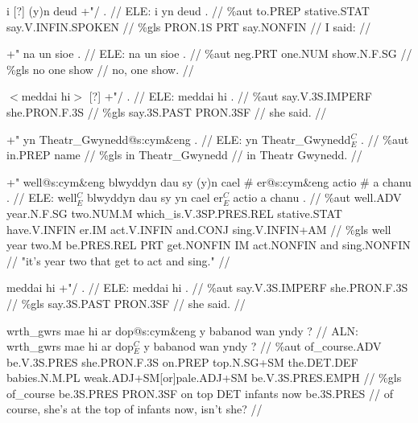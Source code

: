 \documentclass[a4paper,10pt]{article}
\begin{document}
\ex
\begingl[lingstyle=gergl]
\glchat i [?] (y)n deud +"/ . //
\glsurface ELE:  i yn deud .  //
\glauto \%aut  to{\scriptsize .PREP} stative{\scriptsize .STAT} say{\scriptsize .V.INFIN.SPOKEN}   //
\glmanual \%gls  PRON{\scriptsize .1S} PRT say{\scriptsize .NONFIN}   //
\gleng I said: //
\endgl
\xe

\ex
\begingl[lingstyle=gergl]
\glchat +" na un sioe . //
\glsurface ELE:  na un sioe .  //
\glauto \%aut  neg{\scriptsize .PRT} one{\scriptsize .NUM} show{\scriptsize .N.F.SG}   //
\glmanual \%gls  no one show   //
\gleng no, one show. //
\endgl
\xe

\ex
\begingl[lingstyle=gergl]
\glchat $<$meddai hi$>$ [?] +"/ . //
\glsurface ELE:  meddai hi .  //
\glauto \%aut  say{\scriptsize .V.3S.IMPERF} she{\scriptsize .PRON.F.3S}   //
\glmanual \%gls  say{\scriptsize .3S.PAST} PRON{\scriptsize .3SF}   //
\gleng she said. //
\endgl
\xe

\ex
\begingl[lingstyle=gergl]
\glchat +" yn Theatr\_Gwynedd@s:cym\&eng . //
\glsurface ELE:  yn Theatr\_Gwynedd$^{C}_{E}$ .  //
\glauto \%aut  in{\scriptsize .PREP} name   //
\glmanual \%gls  in Theatr\_Gwynedd   //
\gleng in Theatr Gwynedd. //
\endgl
\xe

\ex
\begingl[lingstyle=gergl]
\glchat +" well@s:cym\&eng blwyddyn dau sy (y)n cael \# er@s:cym\&eng actio \# a chanu . //
\glsurface ELE:  well$^{C}_{E}$ blwyddyn dau sy yn cael er$^{C}_{E}$ actio a chanu .  //
\glauto \%aut  well{\scriptsize .ADV} year{\scriptsize .N.F.SG} two{\scriptsize .NUM.M} which\_is{\scriptsize .V.3SP.PRES.REL} stative{\scriptsize .STAT} have{\scriptsize .V.INFIN} er{\scriptsize .IM} act{\scriptsize .V.INFIN} and{\scriptsize .CONJ} sing{\scriptsize .V.INFIN+AM}   //
\glmanual \%gls  well year two{\scriptsize .M} be{\scriptsize .PRES.REL} PRT get{\scriptsize .NONFIN} IM act{\scriptsize .NONFIN} and sing{\scriptsize .NONFIN}   //
\gleng "it's year two that get to act and sing." //
\endgl
\xe

\ex
\begingl[lingstyle=gergl]
\glchat meddai hi +"/ . //
\glsurface ELE:  meddai hi .  //
\glauto \%aut  say{\scriptsize .V.3S.IMPERF} she{\scriptsize .PRON.F.3S}   //
\glmanual \%gls  say{\scriptsize .3S.PAST} PRON{\scriptsize .3SF}   //
\gleng she said. //
\endgl
\xe

\ex
\begingl[lingstyle=gergl]
\glchat wrth\_gwrs mae hi ar dop@s:cym\&eng y babanod wan yndy ? //
\glsurface ALN:  wrth\_gwrs mae hi ar dop$^{C}_{E}$ y babanod wan yndy ?  //
\glauto \%aut  of\_course{\scriptsize .ADV} be{\scriptsize .V.3S.PRES} she{\scriptsize .PRON.F.3S} on{\scriptsize .PREP} top{\scriptsize .N.SG+SM} the{\scriptsize .DET.DEF} babies{\scriptsize .N.M.PL} weak{\scriptsize .ADJ+SM[or]pale.ADJ+SM} be{\scriptsize .V.3S.PRES.EMPH}   //
\glmanual \%gls  of\_course be{\scriptsize .3S.PRES} PRON{\scriptsize .3SF} on top DET infants now be{\scriptsize .3S.PRES}   //
\gleng of course, she's at the top of infants now, isn't she? //
\endgl
\xe
\end{document}
